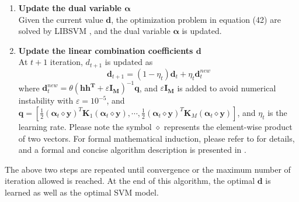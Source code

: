 \begin{enumerate}
	\item{\bf Update the dual variable $\boldsymbol{\alpha}$} \\
	Given the current value $\mathbf{d}$, the optimization problem in equation (42) are  solved by LIBSVM \cite{CC01a}, and the dual variable $\boldsymbol{\alpha}$ is updated.

	\item{\bf Update the linear combination coefficients $\mathbf{d}$}\\
	At $ t+1 $ iteration, $d_{t+1}$ is updated as
	\begin{equation}
	\mathbf{d}_{t+1} = (1 - \eta_t) \mathbf{d}_{t} + \eta_t \mathbf{d}_t^{new}
	\end{equation}
	where $\mathbf{d}_t^{new} = \theta(\mathbf{h h^T} + \varepsilon \mathbf{I_M})^{-1} \mathbf{q}$, and $\varepsilon \mathbf{I_M}$ is added to avoid numerical instability with $\varepsilon = 10^{-5}$, and $\mathbf{q} = [\frac{1}{2}(\boldsymbol{\alpha}_t \diamond \mathbf{y})^T \mathbf{K}_1 (\boldsymbol{\alpha}_t \diamond \mathbf{y}), \cdots, \frac{1}{2}(\boldsymbol{\alpha}_t \diamond \mathbf{y})^T \mathbf{K}_M (\boldsymbol{\alpha}_t \diamond \mathbf{y})]$, and $\eta_t$ is the learning rate. Please note the symbol $\diamond$ represents the element-wise product of two vectors. For formal mathematical induction, please refer to \cite{duan2009domain,duan2012visual} for details, and a formal and concise algorithm description is presented in \cite{duan2012visual}. 
\end{enumerate}

\noindent The above two steps are repeated until convergence or the maximum number of iteration allowed is reached. At the end of this algorithm, the optimal $\mathbf{d}$ is learned as well as the optimal SVM model.

\noindent 
